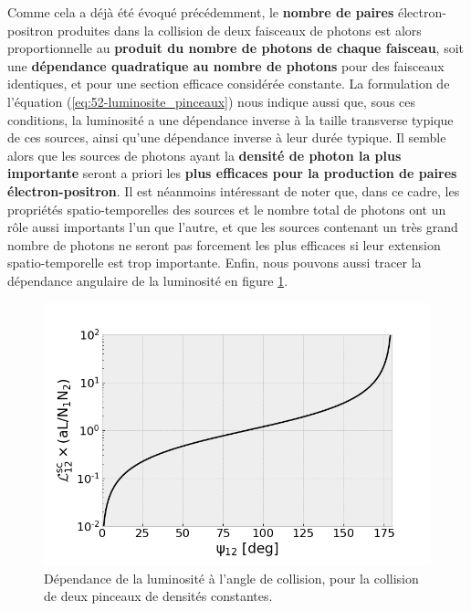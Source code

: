 \begin{refsection}
Comme cela a déjà été évoqué précédemment, le \textbf{nombre de paires} électron-positron produites dans la collision de deux faisceaux de photons est alors proportionnelle au \textbf{produit du nombre de photons de chaque faisceau}, soit une \textbf{dépendance quadratique au nombre de photons} pour des faisceaux identiques, et pour une section efficace considérée constante. La formulation de l'équation (\ref{eq:52-luminosite_pinceaux}) nous indique aussi que, sous ces conditions, la luminosité a une dépendance inverse à la taille transverse typique de ces sources, ainsi qu'une dépendance inverse à leur durée typique. Il semble alors que les sources de photons ayant la \textbf{densité de photon la plus importante} seront a priori les \textbf{plus efficaces pour la production de paires électron-positron}. Il est néanmoins intéressant de noter que, dans ce cadre, les propriétés spatio-temporelles des sources et le nombre total de photons ont un rôle aussi importants l'un que l'autre, et que les sources contenant un très grand nombre de photons ne seront pas forcement les plus efficaces si leur extension spatio-temporelle est trop importante. Enfin, nous pouvons aussi tracer la dépendance angulaire de la luminosité en figure \ref{fig:52-angle_luminosite}.

\begin{figure}[hbtp]
	\centering
	\includegraphics[width=0.7\linewidth]{5-opti_theorique/angle_luminosite.png}
	\caption{Dépendance de la luminosité à l'angle de collision, pour la collision de deux pinceaux de densités constantes.}
	\label{fig:52-angle_luminosite}
\end{figure}


\end{refsection}
